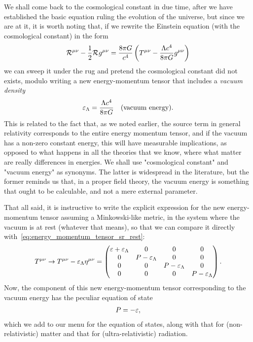 We shall come back to the cosmological constant in due time, after we have established
the basic equation ruling the evolution of the universe, but since we are at it,
it is worth noting that, if we rewrite the Einstein equation (with the cosmological
constant) in the form
\begin{align}
  \mathcal{R}_{}^{\mu\nu} - \frac{1}{2} \mathcal{R}_{} g^{\mu\nu} =
  \frac{8\pi G}{c^4} \left( T^{\mu\nu} - \frac{\Lambda c^4}{8\pi G} g^{\mu\nu} \right)
\end{align}
we can sweep it under the rug and pretend the cosmological constant did not exists,
modulo writing a new energy-momentum tensor that includes a \emph{vacuum density}
\begin{align}
  \varepsilon_\Lambda = \frac{\Lambda c^4}{8\pi G} \quad\text{(vacuum energy)}.
\end{align}
This is related to the fact that, as we noted earlier, the source term in general
relativity corresponds to the entire energy momentum tensor, and if the vacuum has
a non-zero constant energy, this will have measurable implications, as opposed to
what happens in all the theories that we know, where what matter are really differences
in energies. We shall use "cosmological constant" and "vacuum energy" as synonyms.
The latter is widespread in the literature, but the former reminds us that, in a
proper field theory, the vacuum energy is something that ought to be calculable, and
not a mere external parameter.

That all said, it is instructive to write the explicit expression for the new
energy-momentum tensor assuming a Minkowski-like metric, in the system where the
vacuum is at rest (whatever that means), so that we  can compare it directly
with~\eqref{eq:energy_momentum_tensor_sr_rest}:
\begin{align*}
  T^{\mu\nu} \rightarrow
  T^{\mu\nu} - \varepsilon_\Lambda \eta^{\mu\nu} =
  \begin{pmatrix}
    \varepsilon + \varepsilon_\Lambda & 0 & 0 & 0\\
    0 & P - \varepsilon_\Lambda & 0 & 0\\
    0 & 0 & P - \varepsilon_\Lambda & 0\\
    0 & 0 & 0 & P - \varepsilon_\Lambda \\
  \end{pmatrix}.
\end{align*}
Now, the component of this new energy-momentum tensor corresponding to the vacuum
energy has the peculiar equation of state
\begin{align}
  P = -\varepsilon,
\end{align}
which we add to our menu for the equation of states, along with that for (non-relativistic)
matter and that for (ultra-relativistic) radiation.



